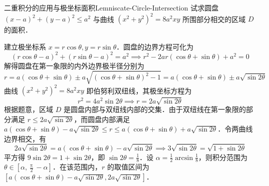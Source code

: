 \begin{problem}{二重积分的应用与极坐标面积}{Lemniscate-Circle-Intersection}
    试求圆盘 $(x-a)^2 + (y-a)^2 \leqslant a^2$ 与曲线 $(x^2 + y^2)^2 = 8a^2 xy$ 所围部分相交的区域 $D$ 的面积．
\end{problem}

\begin{solution}
    建立极坐标系 $x = r \cos \theta, y = r \sin \theta$．圆盘的边界方程可化为
    \begin{equation}
        (r \cos \theta - a)^2 + (r \sin \theta - a)^2 = a^2 \implies r^2 - 2ar(\cos \theta + \sin \theta) + a^2 = 0
    \end{equation}
    解得圆盘在第一象限的内外边界极半径分别为
    \begin{equation}
        r = a(\cos \theta + \sin \theta) \pm a \sqrt{(\cos \theta + \sin \theta)^2 - 1} = a(\cos \theta + \sin \theta) \pm a \sqrt{\sin 2\theta}
    \end{equation}
    曲线 $(x^2 + y^2)^2 = 8a^2 xy$ 即伯努利双纽线，其极坐标方程为
    \begin{equation}
        r^2 = 4a^2 \sin 2\theta \implies r = 2a \sqrt{\sin 2\theta}
    \end{equation}
    根据题意，区域 $D$ 是圆盘内部与双纽线内部的交集．由于双纽线在第一象限的部分满足 $r \leqslant 2a\sqrt{\sin 2\theta}$，而圆盘内部满足 $a(\cos \theta + \sin \theta) - a \sqrt{\sin 2\theta} \leqslant r \leqslant a(\cos \theta + \sin \theta) + a \sqrt{\sin 2\theta}$．令两曲线边界相交，有
    \begin{equation}
        2a\sqrt{\sin 2\theta} = a(\cos \theta + \sin \theta) - a\sqrt{\sin 2\theta} \implies 3\sqrt{\sin 2\theta} = \sqrt{1 + \sin 2\theta}
    \end{equation}
    平方得 $9\sin 2\theta = 1 + \sin 2\theta$，即 $\sin 2\theta = \frac{1}{8}$．设 $\alpha = \frac{1}{2} \arcsin \frac{1}{8}$，则积分范围为 $\theta \in [\alpha, \frac{\uppi}{2} - \alpha]$．在该范围内，$r$ 的取值区间为 $[a(\cos \theta + \sin \theta) - a\sqrt{\sin 2\theta}, 2a\sqrt{\sin 2\theta}]$．


\end{solution}
